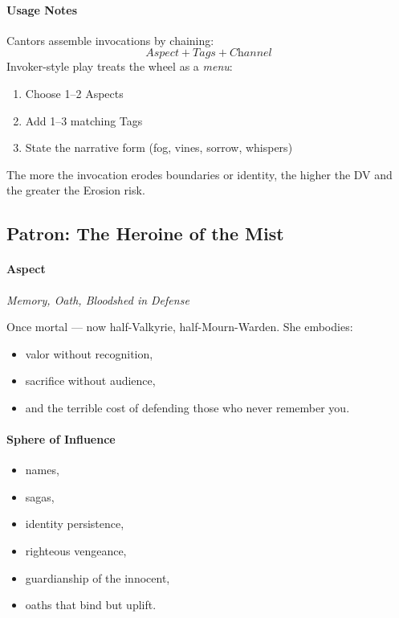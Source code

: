 \documentclass[11pt]{article}
\begin{document}
\paragraph*{Usage Notes}
Cantors assemble invocations by chaining:
\[
\textit{Aspect} + \textit{Tags} + \textit{Channel}
\]
Invoker-style play treats the wheel as a \emph{menu}:
\begin{enumerate}
    \item Choose 1--2 Aspects
    \item Add 1--3 matching Tags
    \item State the narrative form (fog, vines, sorrow, whispers)
\end{enumerate}

\noindent
The more the invocation erodes boundaries or identity,  
the higher the DV and the greater the Erosion risk.


\subsection{Patron: The Heroine of the Mist}
\label{patron:mist_heroine}

\paragraph*{Aspect}
\textit{Memory, Oath, Bloodshed in Defense}

Once mortal --- now half-Valkyrie, half-Mourn-Warden.  
She embodies:
\begin{itemize}
    \item valor without recognition,
    \item sacrifice without audience,
    \item and the terrible cost of defending those who never remember you.
\end{itemize}

\paragraph*{Sphere of Influence}
\begin{itemize}
    \item names,
    \item sagas,
    \item identity persistence,
    \item righteous vengeance,
    \item guardianship of the innocent,
    \item oaths that bind but uplift.
\end{itemize}
\end{document}
